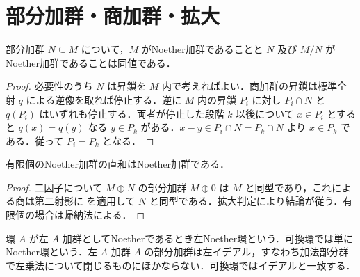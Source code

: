 \section{部分加群・商加群・拡大}
\begin{prop}[Noether性の拡大判定]
部分加群 $N\subseteq M$ について，$M$ がNoether加群であることと $N$ 及び $M/N$ がNoether加群であることは同値である．
\end{prop}
\begin{proof}
必要性のうち $N$ は昇鎖を $M$ 内で考えればよい．商加群の昇鎖は標準全射 $q$ による逆像を取れば停止する．逆に $M$ 内の昇鎖 $P_i$ に対し $P_i\cap N$ と $q(P_i)$ はいずれも停止する．両者が停止した段階 $k$ 以後について $x\in P_i$ とすると $q(x)=q(y)$ なる $y\in P_k$ がある．$x-y\in P_i\cap N=P_k\cap N$ より $x\in P_k$ である．従って $P_i=P_k$ となる．
\end{proof}
\begin{prop}[有限直和のNoether性]
有限個のNoether加群の直和はNoether加群である．
\end{prop}
\begin{proof}
二因子について $M\oplus N$ の部分加群 $M\oplus0$ は $M$ と同型であり，これによる商は第二射影に  を適用して $N$ と同型である．拡大判定により結論が従う．有限個の場合は帰納法による．
\end{proof}
\begin{defn}[左Noether環]
環 $A$ が左 $A$ 加群としてNoetherであるとき左Noether環という．可換環では単にNoether環という．左 $A$ 加群 $A$ の部分加群は左イデアル，すなわち加法部分群で左乗法について閉じるものにほかならない．可換環ではイデアルと一致する．
\end{defn}
